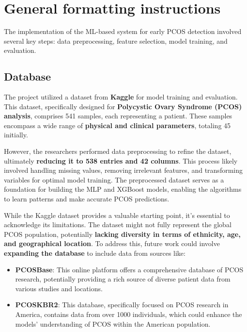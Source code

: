 \documentclass{article}
\begin{document}
\section{General formatting instructions}
\label{gen_inst}







The implementation of the ML-based system for early PCOS detection involved several key steps: data preprocessing, feature selection, model training, and evaluation.

\subsection{Database}

The project utilized a dataset from \textbf{Kaggle} for model training and evaluation. This dataset, specifically designed for \textbf{Polycystic Ovary Syndrome (PCOS) analysis}, comprises 541 samples, each representing a patient. These samples encompass a wide range of \textbf{physical and clinical parameters}, totaling 45 initially.  

However, the researchers performed data preprocessing to refine the dataset, ultimately \textbf{reducing it to 538 entries and 42 columns}. This process likely involved handling missing values, removing irrelevant features, and transforming variables for optimal model training. The preprocessed dataset serves as a foundation for building the MLP and XGBoost models, enabling the algorithms to learn patterns and make accurate PCOS predictions.

While the Kaggle dataset provides a valuable starting point, it's essential to acknowledge its limitations. The dataset might not fully represent the global PCOS population, potentially \textbf{lacking diversity in terms of ethnicity, age, and geographical location}. To address this, future work could involve \textbf{expanding the database} to include data from sources like:

\begin{itemize}
    \item \textbf{PCOSBase}: This online platform offers a comprehensive database of PCOS research, potentially providing a rich source of diverse patient data from various studies and locations.
    \item \textbf{PCOSKBR2}: This database, specifically focused on PCOS research in America, contains data from over 1000 individuals, which could enhance the models' understanding of PCOS within the American population.
\end{itemize}
\end{document}
